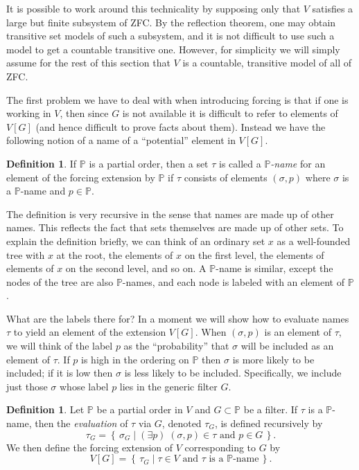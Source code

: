 \documentclass[11pt,oneside,a4paper]{amsbook}
\newcommand{\set}[1]{\left\{\,#1\,\right\}}
\newcommand{\PP}{\mathbb P}
\theoremstyle{definition}
\theoremstyle{plain}
\theoremstyle{definition}
\newtheorem{definition}[theorem]{Definition}
\theoremstyle{remark}
\numberwithin{equation}{section}
\numberwithin{figure}{section}
\begin{document}
It is possible to work around this technicality by supposing only that $V$ satisfies a large but finite subsystem of ZFC. By the reflection theorem, one may obtain transitive set models of such a subsystem, and it is not difficult to use such a model to get a countable transitive one. However, for simplicity we will simply assume for the rest of this section that $V$ is a countable, transitive model of all of ZFC.


The first problem we have to deal with when introducing forcing is that if one is working in $V$, then since $G$ is not available it is difficult to refer to elements of $V[G]$ (and hence difficult to prove facts about them). Instead we have the following notion of a name of a ``potential'' element in $V[G]$.

\begin{definition}
  If $\PP$ is a partial order, then a set $\tau$ is called a \emph{$\PP$-name} for an element of the forcing extension by $\mathbb P$ if $\tau$ consists of elements $(\sigma,p)$ where $\sigma$ is a \emph{$\PP$}-name and $p\in\PP$.
\end{definition}

The definition is very recursive in the sense that names are made up of other names. This reflects the fact that sets themselves are made up of other sets. To explain the definition briefly, we can think of an ordinary set $x$ as a well-founded tree with $x$ at the root, the elements of $x$ on the first level, the elements of elements of $x$ on the second level, and so on. A $\PP$-name is similar, except the nodes of the tree are also $\PP$-names, and each node is labeled with an element of $\PP$.

What are the labels there for? In a moment we will show how to evaluate names $\tau$ to yield an element of the extension $V[G]$. When $(\sigma,p)$ is an element of $\tau$, we will think of the label $p$ as the ``probability'' that $\sigma$ will be included as an element of $\tau$. If $p$ is high in the ordering on $\PP$ then $\sigma$ is more likely to be included; if it is low then $\sigma$ is less likely to be included. Specifically, we include just those $\sigma$ whose label $p$ lies in the generic filter $G$.

\begin{definition}
  Let $\PP$ be a partial order in $V$ and $G\subset\PP$ be a filter. If $\tau$ is a $\PP$-name, then the \emph{evaluation} of $\tau$ via $G$, denoted $\tau_G$, is defined recursively by
  \[\tau_G=\set{\sigma_G\mid (\exists p)\;(\sigma,p)\in\tau\text{ and }p\in G}\text{.}
  \]
  We then define the forcing extension of $V$ corresponding to $G$ by
  \[V[G]=\set{\tau_G\mid\text{$\tau\in V$ and $\tau$ is a $\PP$-name}}\text{.}
  \]
\end{definition}
\end{document}
